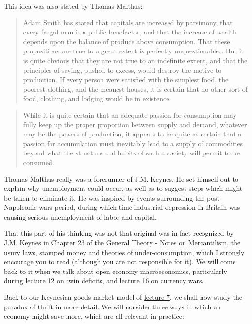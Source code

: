 \documentclass[]{book}
\theoremstyle{definition}
\theoremstyle{definition}
\theoremstyle{definition}
\theoremstyle{remark}
\begin{document}
This idea was also stated by Thomas Malthus:

\begin{quote}
Adam Smith has stated that capitals are increased by parsimony, that
every frugal man is a public benefactor, and that the increase of wealth
depends upon the balance of produce above consumption. That these
propositions are true to a great extent is perfectly
unquestionable\ldots{} But it is quite obvious that they are not true to
an indefinite extent, and that the principles of saving, pushed to
excess, would destroy the motive to production. If every person were
satisfied with the simplest food, the poorest clothing, and the meanest
houses, it is certain that no other sort of food, clothing, and lodging
would be in existence.
\end{quote}

\begin{quote}
While it is quite certain that an adequate passion for consumption may
fully keep up the proper proportion between supply and demand, whatever
may be the powers of production, it appears to be quite as certain that
a passion for accumulation must inevitably lead to a supply of
commodities beyond what the structure and habits of such a society will
permit to be consumed.
\end{quote}

Thomas Malthus really was a forerunner of J.M. Keynes. He set himself
out to explain why unemployment could occur, as well as to suggest steps
which might be taken to eliminate it. He was inspired by events
surrounding the post-Napoleonic wars period, during which time
industrial depression in Britain was causing serious unemployment of
labor and capital.

That this part of his thinking was not that original was in fact
recognized by J.M. Keynes in
\href{http://cas2.umkc.edu/economics/people/facultypages/kregel/courses/econ645/winter2011/generaltheory.pdf}{Chapter
23 of the General Theory - Notes on Mercantilism, the usury laws,
stamped money and theories of under-consumption}, which I strongly
encourage you to read (although you are not responsible for it). We will
come back to it when we talk about open economy macroeconomics,
particularly during \href{lecture12.html}{lecture 12} on twin deficits,
and \href{lecture16.html}{lecture 16} on currency wars.

Back to our Keynesian goods market model of \href{lecture7.html}{lecture
7}, we shall now study the paradox of thrift in more detail. We will
consider three ways in which an economy might save more, which are all
relevant in practice:
\end{document}
